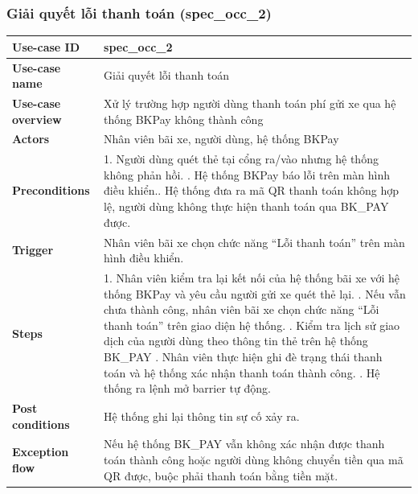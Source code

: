 \subsubsection{Giải quyết lỗi thanh toán (spec\_occ\_2)}
\begingroup
\small
\begin{longtable}{|>{\centering\arraybackslash}m{3cm}|m{13.7cm}|}
\hline
\textbf{Use-case ID} & spec\_occ\_2   \\ \hline
\textbf{Use-case name} & Giải quyết lỗi thanh toán   \\ \hline
\textbf{Use-case overview} & Xử lý trường hợp người dùng thanh toán phí gửi xe qua hệ thống BKPay không thành công   \\ \hline
\textbf{Actors} & Nhân viên bãi xe, người dùng, hệ thống BKPay  \\ \hline
\textbf{Preconditions} & 1. Người dùng quét thẻ tại cổng ra/vào nhưng hệ thống không phản hồi. \newline
2. Hệ thống BKPay báo lỗi trên màn hình điều khiển.\newline
3. Hệ thống đưa ra mã QR thanh toán không hợp lệ, người dùng không thực hiện thanh toán qua BK\_PAY được.\\ \hline
\textbf{Trigger} & Nhân viên bãi xe chọn chức năng “Lỗi thanh toán” trên màn hình điều khiển.   \\ \hline
\textbf{Steps} & 
1. Nhân viên kiểm tra lại kết nối của hệ thống bãi xe với hệ thống BKPay và yêu cầu người gửi xe quét thẻ lại. \newline
2. Nếu vẫn chưa thành công, nhân viên bãi xe chọn chức năng “Lỗi thanh toán” trên giao diện hệ thống. \newline
3. Kiểm tra lịch sử giao dịch của người dùng theo thông tin thẻ trên hệ thống BK\_PAY \newline
4. Nhân viên thực hiện ghi đè trạng thái thanh toán và hệ thống xác nhận thanh toán thành công. \newline
5. Hệ thống ra lệnh mở barrier tự động.   \\ \hline
\textbf{Post conditions} & Hệ thống ghi lại thông tin sự cố xảy ra. \\ \hline
\textbf{Exception flow} & Nếu hệ thống BK\_PAY vẫn không xác nhận được thanh toán thành công hoặc người dùng không chuyển tiền qua mã QR được, buộc phải thanh toán bằng tiền mặt. \\ \hline
\end{longtable}
\endgroup

